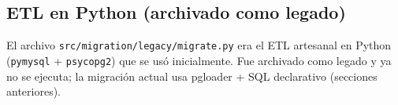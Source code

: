 





\subsection{ETL en Python (archivado como legado)}

El archivo \texttt{src/migration/legacy/migrate.py} era el ETL artesanal en
Python (\texttt{pymysql} + \texttt{psycopg2}) que se usó inicialmente. Fue
archivado como legado y ya no se ejecuta; la migración actual usa pgloader +
SQL declarativo (secciones anteriores).





